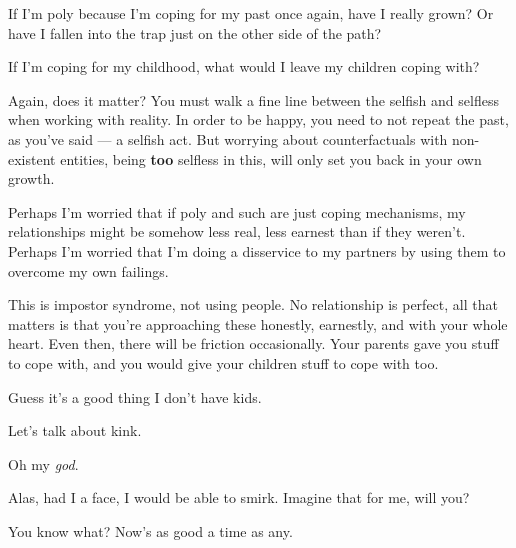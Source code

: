 \begin{paracol}{2}
\begin{leftcolumn}
If I'm poly because I'm coping for my past once again, have I really grown? Or have I fallen into the trap just on the other side of the path?

If I'm coping for my childhood, what would I leave my children coping with?

\begin{ally}
Again, does it matter? You must walk a fine line between the selfish and selfless when working with reality. In order to be happy, you need to not repeat the past, as you've said --- a selfish act. But worrying about counterfactuals with non-existent entities, being \textbf{too} selfless in this, will only set you back in your own growth.
\end{ally}
Perhaps I'm worried that if poly and such are just coping mechanisms, my relationships might be somehow less real, less earnest than if they weren't. Perhaps I'm worried that I'm doing a disservice to my partners by using them to overcome my own failings.

\begin{ally}
This is impostor syndrome, not using people. No relationship is perfect, all that matters is that you're approaching these honestly, earnestly, and with your whole heart. Even then, there will be friction occasionally. Your parents gave you stuff to cope with, and you would give your children stuff to cope with too.
\end{ally}
Guess it's a good thing I don't have kids.

\begin{ally}
Let's talk about kink.
\end{ally}
Oh my \emph{god}.

\begin{ally}
Alas, had I a face, I would be able to smirk. Imagine that for me, will you?
\end{ally}
You know what? Now's as good a time as any.
\newpage

\end{leftcolumn}
\end{paracol}
\resetbackgroundcolor
